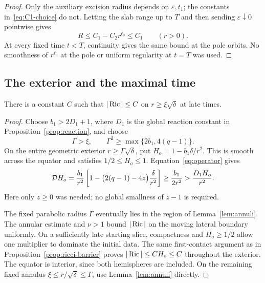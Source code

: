 \begin{proof}
Only the auxiliary excision radius depends on \(\varepsilon,t_1\);
the constants in~\eqref{eq:C1-choice} do not. Letting the slab range up to
\(T\) and then sending \(\varepsilon\downarrow0\) pointwise gives
\[
R\le C_1-C_2r^{\ell_0}\le C_1\qquad(r>0).
\]
At every fixed time \(t<T\), continuity gives the same bound at the
pole orbits. No smoothness of \(r^{\ell_0}\) at the pole or uniform
regularity at \(t=T\) was used.
\end{proof}

\subsection{The exterior and the maximal time}

\begin{proposition}\label{prop:exterior}
There is a constant \(C\) such that
\(|\operatorname{Ric}|\le C\) on \(r\ge\xi\sqrt\delta\) at late times.
\end{proposition}

\begin{proof}
Choose \(b_1>2D_1+1\), where \(D_1\) is the global reaction constant
in Proposition~\ref{prop:reaction}, and choose
\begin{equation}\label{eq:exterior-choices}
\Gamma>\xi,\qquad \Gamma^2\ge\max\{2b_1,4(q-1)\}.
\end{equation}
On the entire geometric exterior \(r\ge\Gamma\sqrt\delta\), put
\(H_o=1-b_1\delta/r^2\). This is smooth across the equator and satisfies
\(1/2\le H_o\le1\). Equation~\eqref{eq:operator} gives
\begin{equation}\label{eq:outer-barrier}
\mathcal D H_o=\frac{b_1}{r^2}
\left[1-\bigl(2(q-1)-4z\bigr)\frac{\delta}{r^2}\right]
\ge\frac{b_1}{2r^2}>\frac{D_1H_o}{r^2}.
\end{equation}
Here only \(z\ge0\) was needed; no global smallness of \(z-1\) is
required.

The fixed parabolic radius \(\Gamma\) eventually lies in the region of
Lemma~\ref{lem:annuli}. The annular estimate and \(\nu>1\) bound \(|\operatorname{Ric}|\) on
the moving lateral boundary uniformly. On a sufficiently late starting
slice, compactness and \(H_o\ge1/2\) allow one multiplier to dominate
the initial data. The same first-contact argument as in
Proposition~\ref{prop:ricci-barrier} proves \(|\operatorname{Ric}|\le CH_o\le C\)
throughout the exterior. The equator is interior, since both hemispheres
are included. On the remaining fixed annulus
\(\xi\le r/\sqrt\delta\le\Gamma\), use Lemma~\ref{lem:annuli}
directly.
\end{proof}

